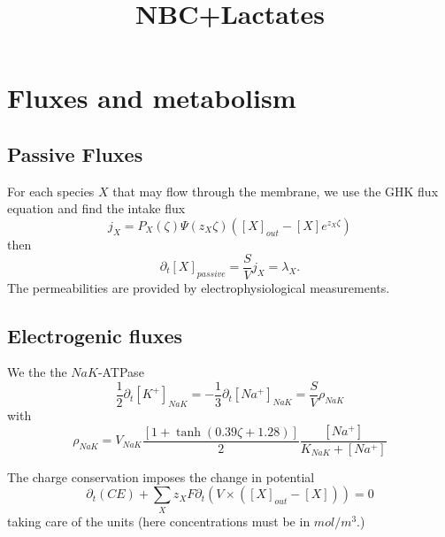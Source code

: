 \documentclass{revtex4}
\begin{document}
\title{NBC+Lactates}
\maketitle

\section{Fluxes and metabolism}

\subsection{Passive Fluxes}
For each species $X$ that may flow through the membrane, we use the GHK flux equation and find the intake flux
\begin{equation}
	j_X =  P_X\left(\zeta\right) \Psi(z_X\zeta)
	\left([X]_{out} - [X]e^{z_X\zeta}\right)
\end{equation}
then
\begin{equation}
	\partial_t [X]_{passive} = \dfrac{S}{V} j_X = \lambda_X.
\end{equation}
The permeabilities are provided by electrophysiological measurements.

\subsection{Electrogenic fluxes}
We the the $NaK$-ATPase
\begin{equation}
	\dfrac{1}{2} \partial_t \left[K^+\right]_{{NaK}} = -\dfrac{1}{3} \partial_t \left[ Na^+\right]_{{NaK}}
	= \dfrac{S}{V}\rho_{NaK}
\end{equation}
with
\begin{equation}
	\rho_{NaK} = V_{NaK} \dfrac{\left[1+\tanh\left(0.39\zeta+1.28\right)\right]}{2}\dfrac{\left[Na^+\right]}{K_{NaK}+\left[Na^+\right]}
\end{equation}

The charge conservation imposes the change in potential
\begin{equation}
	\partial_t\left( C E\right) + \sum_X z_X F \partial_t\left( V \times  (\left[X\right]_{out}-\left[X\right]) \right) = 0
\end{equation}
taking care of the units (here concentrations must be in $mol/m^3$.)
\end{document}
